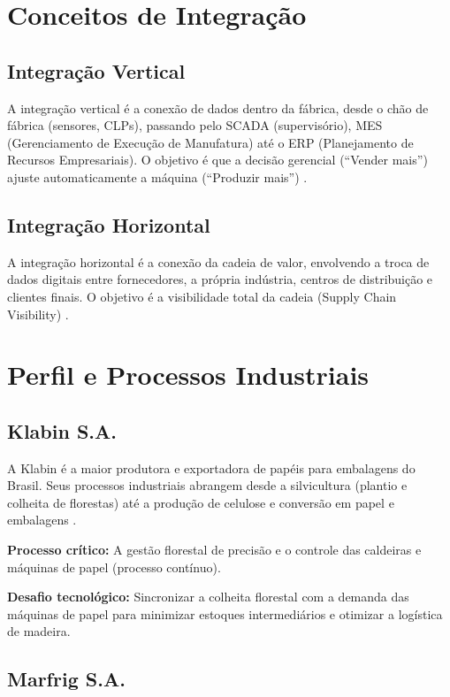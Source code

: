 \documentclass[12pt,a4paper,oneside]{article}
\begin{document}
\section{Conceitos de Integração}

\subsection{Integração Vertical}

A integração vertical é a conexão de dados dentro da fábrica, desde o chão de fábrica (sensores, CLPs), passando pelo SCADA (supervisório), MES (Gerenciamento de Execução de Manufatura) até o ERP (Planejamento de Recursos Empresariais). O objetivo é que a decisão gerencial (``Vender mais'') ajuste automaticamente a máquina (``Produzir mais'') \cite{groover2011}.

\subsection{Integração Horizontal}

A integração horizontal é a conexão da cadeia de valor, envolvendo a troca de dados digitais entre fornecedores, a própria indústria, centros de distribuição e clientes finais. O objetivo é a visibilidade total da cadeia (Supply Chain Visibility) \cite{caiçara2015}.

\section{Perfil e Processos Industriais}

\subsection{Klabin S.A.}

A Klabin é a maior produtora e exportadora de papéis para embalagens do Brasil. Seus processos industriais abrangem desde a silvicultura (plantio e colheita de florestas) até a produção de celulose e conversão em papel e embalagens \cite{klabin2026}.

\textbf{Processo crítico:} A gestão florestal de precisão e o controle das caldeiras e máquinas de papel (processo contínuo).

\textbf{Desafio tecnológico:} Sincronizar a colheita florestal com a demanda das máquinas de papel para minimizar estoques intermediários e otimizar a logística de madeira.

\subsection{Marfrig S.A.}
\end{document}
